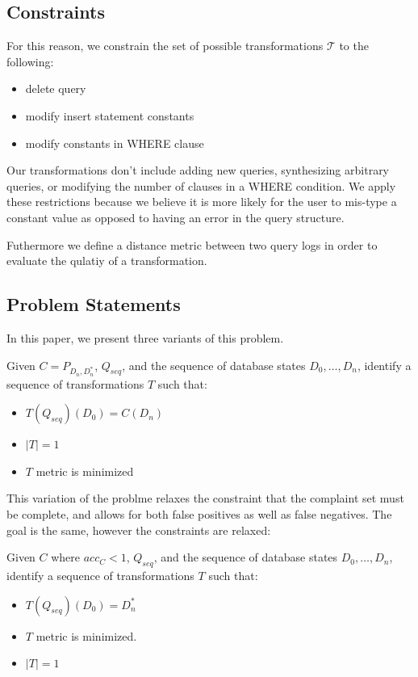 \subsection{Constraints}

For this reason, we constrain the set of possible transformations $\mathcal{T}$ to the following:

\begin{itemize}
\item delete query
\item modify insert statement constants
\item modify constants in WHERE clause
\end{itemize}

Our transformations don't include adding new queries, synthesizing arbitrary queries, or modifying the
number of clauses in a WHERE condition.  We apply these restrictions because we believe it is more likely
for the user to mis-type a constant value as opposed to having an error in the query structure.

Futhermore we define a distance metric between two query logs in order to evaluate
the qulatiy of a transformation.



\subsection{Problem Statements}

In this paper, we present three variants of this problem.

\begin{problem}\label{prob:complete}
Given $C = P_{D_n, D^*_n}$, $Q_{seq}$, and the sequence of database states $D_0,\ldots,D_n$, 
identify a sequence of transformations $T$ such that:
\begin{itemize}
\item $T(Q_{seq})(D_0) = C(D_n)$
\item $|T| = 1$
\item $T$ metric is minimized
\end{itemize}
\end{problem}

This variation of the problme relaxes the constraint that the complaint set must be complete, and allows
for both false positives as well as false negatives.  The goal is the same, however the constraints are relaxed:

\begin{problem}\label{prob:incomplete}
Given $C$ where $acc_C < 1$, $Q_{seq}$, and the sequence of database states $D_0,\ldots,D_n$, 
identify a sequence of transformations $T$ such that:
\begin{itemize}
\item $T(Q_{seq})(D_0) = D^*_n$
\item $T$ metric is minimized.
\item $|T| = 1$
\end{itemize}
\end{problem}

